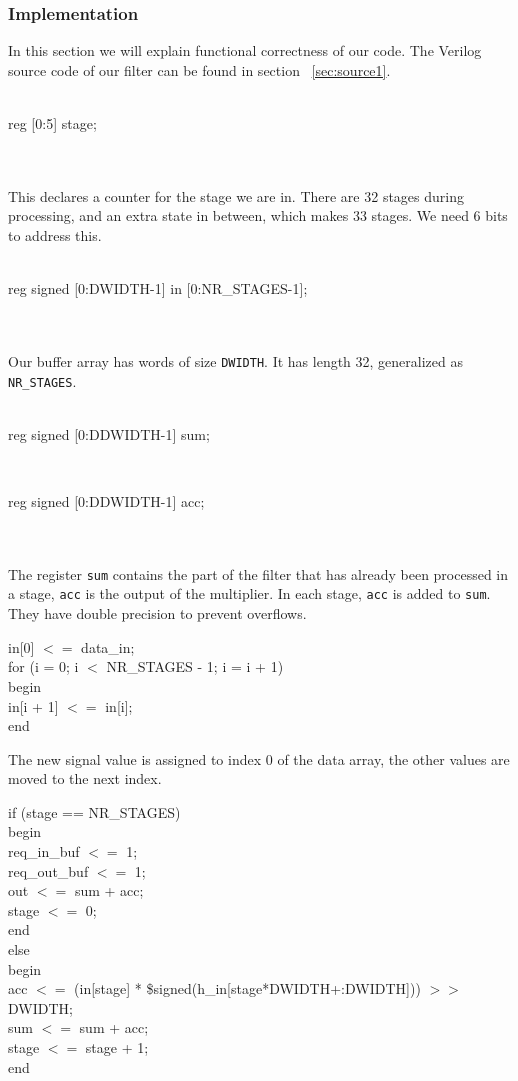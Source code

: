 \subsubsection{Implementation}
In this section we will explain functional correctness of our code. The Verilog source code of our filter can be found in section ~\ref{sec:source1}. \\
\\
\centerline{reg [0:5] stage;}\\
\\
This declares a counter for the stage we are in. There are 32 stages during processing, and an extra state in between, which makes 33 stages. We need 6 bits to address this.\\
\\
\centerline{reg signed [0:DWIDTH-1] in [0:NR\_STAGES-1];}\\
\\
Our buffer array has words of size \texttt{DWIDTH}. It has length 32, generalized as \texttt{NR\_STAGES}.\\
\\
\centerline{reg signed [0:DDWIDTH-1] sum;}\\
\centerline{reg signed [0:DDWIDTH-1] acc;}\\
\\
The register  \texttt{sum} contains the part of the filter that has already been processed in a stage,  \texttt{acc} is the output of the multiplier. In each stage,  \texttt{acc} is added to  \texttt{sum}. They have double precision to prevent overflows.
\begin{center}
\parbox{8cm}{
 in[0] $<=$ data\_in; \\
for (i = 0; i $<$ NR\_STAGES - 1; i = i + 1) \\
begin \\
in[i + 1] $<=$ in[i]; \\
end \\
}
\end{center}
The new signal value is assigned to index 0 of the data array, the other values are moved to the next index.
\begin{center}
\parbox{10cm}{
if (stage == NR\_STAGES)\\
begin\\
\phantom{aaaa}req\_in\_buf $<=$ 1;\\
\phantom{aaaa}req\_out\_buf $<=$ 1;\\
\phantom{aaaa}out $<=$ sum + acc;\\
\phantom{aaaa}stage $<=$ 0;\\
end\\
else\\
begin\\
\phantom{aaaa}acc $<=$ (in[stage] * \$signed(h\_in[stage*DWIDTH+:DWIDTH])) $>>$ DWIDTH;\\
\phantom{aaaa}sum $<=$ sum + acc;\\
\phantom{aaaa}stage $<=$ stage + 1;\\
end\\
}
\end{center}
